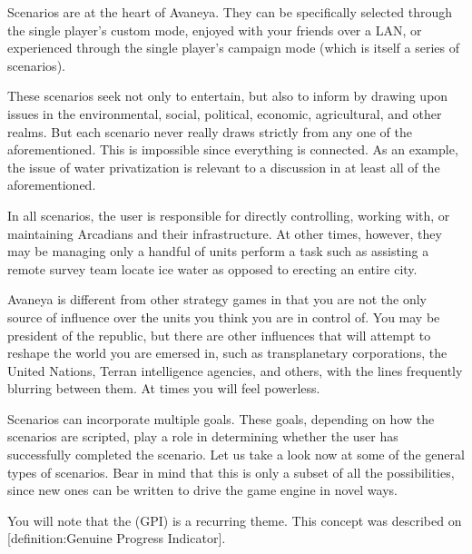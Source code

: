 

Scenarios are at the heart of Avaneya. They can be specifically selected through the single player's custom mode, enjoyed with your friends over a LAN, or experienced through the single player's campaign mode (which is itself a series of scenarios). 

These scenarios seek not only to entertain, but also to inform by drawing upon issues in the environmental, social, political, economic, agricultural, and other realms. But each scenario never really draws strictly from any one of the aforementioned. This is impossible since everything is connected. As an example, the issue of water privatization is relevant to a discussion in at least all of the aforementioned. 

In all scenarios, the user is responsible for directly controlling, working with, or maintaining Arcadians and their infrastructure. At other times, however, they may be managing only a handful of units perform a task such as assisting a remote survey team locate ice water as opposed to erecting an entire city.

Avaneya is different from other strategy games in that you are not the only source of influence over the units you think you are in control of. You may be president of the republic, but there are other influences that will attempt to reshape the world you are emersed in, such as transplanetary corporations, the United Nations, Terran intelligence agencies, and others, with the lines frequently blurring between them. At times you will feel powerless.

Scenarios can incorporate multiple goals. These goals, depending on how the scenarios are scripted, play a role in determining whether the user has successfully completed the scenario. Let us take a look now at some of the general types of scenarios. Bear in mind that this is only a subset of all the possibilities, since new ones can be written to drive the game engine in novel ways.

You will note that the  (GPI) is a recurring theme. This concept was described on [definition:Genuine Progress Indicator].

\startitemize[4]
\setupwhitespace[big]

